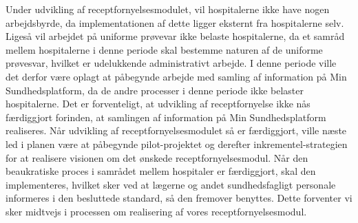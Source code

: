 Under udvikling af receptfornyelsesmodulet, vil hospitalerne ikke have nogen arbejdsbyrde, da implementationen af dette ligger eksternt fra hospitalerne selv. Ligeså vil arbejdet på uniforme prøvevar ikke belaste hospitalerne, da et samråd mellem hospitalerne i denne periode skal bestemme naturen af de uniforme prøvesvar, hvilket er udelukkende administrativt arbejde. I denne periode ville det derfor være oplagt at påbegynde arbejde med samling af information på Min Sundhedsplatform, da de andre processer i denne periode ikke belaster hospitalerne. Det er forventeligt, at udvikling af receptfornyelse ikke nås færdiggjort forinden, at samlingen af information på Min Sundhedsplatform realiseres. Når udvikling af receptfornyelsesmodulet så er færdiggjort, ville næste led i planen være at påbegynde pilot-projektet og derefter inkrementel-strategien for at realisere visionen om det ønskede receptfornyelsesmodul.
Når den beaukratiske proces i samrådet mellem hospitaler er færdiggjort, skal den implementeres, hvilket sker ved at lægerne og andet sundhedsfagligt personale informeres i den besluttede standard, så den fremover benyttes. Dette forventer vi sker midtvejs i processen om realisering af vores receptfornyelsesmodul.
